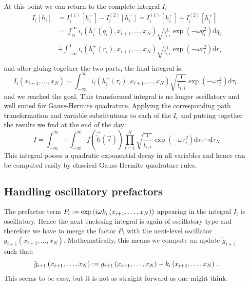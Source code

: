 \documentclass[a4paper,10pt]{article}
\begin{document}
At this point we can return to the complete integral $I_i$
\begin{equation}
\begin{split}
  I_i[h_i] & = I_i^{(1)}[h_i^{+}] - I_i^{(2)}[h_i^{-}] = I_i^{(1)}[h_i^{+}] + I_i^{(2)}[h_i^{+}] \\
  & = \int_0^\infty
    i_i\left(h_i^{+}\left(q_i\right), x_{i+1},\ldots,x_N\right)
    \sqrt{\frac{\imath}{t_{i,i}}}
    \exp\left(- \omega q_i^2\right)
  \mathrm{d}q_i \\
  & +
  \int_{-\infty}^0
    i_i\left(h_i^{+}\left(r_i\right), x_{i+1},\ldots,x_N\right)
    \sqrt{\frac{\imath}{t_{i,i}}}
    \exp\left(- \omega r_i^2\right)
  \mathrm{d}r_i \\
\end{split}
\end{equation}
and after gluing together the two parts, the final integral is:
\begin{equation}
  I_i\left(x_{i+1},\ldots,x_N\right) =
  \int_{-\infty}^\infty
    i_i\left(h_i^{+}\left(\tau_i\right), x_{i+1},\ldots,x_N\right)
    \sqrt{\frac{\imath}{t_{i,i}}}
    \exp\left(- \omega \tau_i^2\right)
  \mathrm{d}\tau_i \,.
\end{equation}
and we reached the goal. This transformed integral is no longer
oscillatory and well suited for Gauss-Hermite quadrature.
Applying the corresponding path transformation and variable substitutions
to each of the $I_i$ and putting together the results we find at the end
of the day:
\begin{equation} \label{eq:transformed_integral}
\boxed{
 I = \int_{-\infty}^\infty \cdots \int_{-\infty}^\infty
       f\left(\vec{\tilde{h}}(\vec{\tau})\right)
       \prod_{i=1}^N \sqrt{\frac{\imath}{t_{i,i}}}
                     \exp\left(-\omega \tau_i^2\right)
    \mathrm{d}\tau_1 \cdots \mathrm{d}\tau_N
}
\end{equation}
This integral posses a quadratic exponential decay in all variables and
hence can be computed easily by classical Gauss-Hermite quadrature
rules.


\subsection{Handling oscillatory prefactors}


The prefactor term $P_i := \exp\left(i\omega k_i\left(x_{i+1},\ldots,x_N\right)\right)$
appearing in the integral $I_i$ is oscillatory. Hence the next
enclosing integral is again of oscillatory type and therefore we
have to merge the factor $P_i$ with the next-level oscillator
$g_{i+1}\left(x_{i+1},\ldots,x_N\right)$.
Mathematically, this means we compute an update $\grave{g}_{i+1}$
such that:
\begin{equation} \label{eq:update_equation}
  \grave{g}_{i+1}\left(x_{i+1}, \ldots ,x_N\right)
  := g_{i+1}\left(x_{i+1}, \ldots ,x_N\right)
        + k_i\left(x_{i+1}, \ldots ,x_N\right) \,.
\end{equation}
This seems to be easy, but it is not as straight forward as
one might think.
\end{document}
